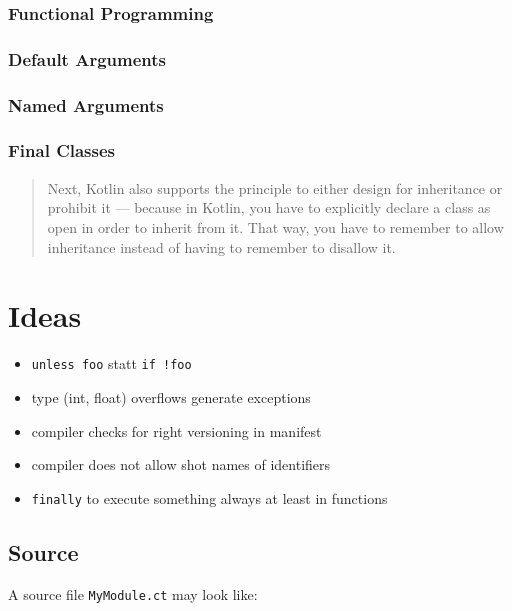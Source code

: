 \documentclass[a4paper,12pt]{article}
\begin{document}
\subsubsection{Functional Programming}

\subsubsection{Default Arguments}

\subsubsection{Named Arguments}

\subsubsection{Final Classes}

\begin{quotation}
Next, Kotlin also supports the principle to either design for inheritance or prohibit it — because in Kotlin, you have to explicitly declare a class as open in order to inherit from it. That way, you have to remember to allow inheritance instead of having to remember to disallow it.\cite{kotlin-sommerhoff}
\end{quotation}

\section{Ideas}

\begin{itemize}
	\item \verb|unless foo| statt \verb|if !foo|
	\item type (int, float) overflows generate exceptions
	\item compiler checks for right versioning in manifest
	\item compiler does not allow shot names of identifiers
	\item \verb|finally| to execute something always at least in functions
\end{itemize}

\subsection{Source}

A source file \verb|MyModule.ct| may look like:
\end{document}
